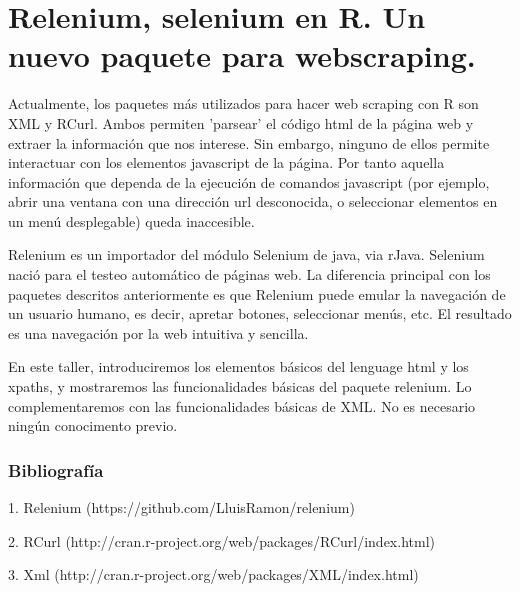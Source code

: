 \chapter{Relenium, selenium en R. Un nuevo paquete para webscraping.}




Actualmente, los paquetes más utilizados para hacer web scraping con R son XML y RCurl. Ambos permiten 'parsear' el código html de la página web y extraer la información que nos interese. Sin embargo, ninguno de ellos permite interactuar con los elementos javascript de la página. Por tanto aquella información que dependa de la ejecución de comandos javascript (por ejemplo, abrir una ventana con una dirección url desconocida, o seleccionar elementos en un menú desplegable) queda inaccesible.

Relenium es un importador del módulo Selenium de java, via rJava. Selenium nació para el testeo automático de páginas web. La diferencia principal con los paquetes descritos anteriormente es que Relenium puede emular la navegación de un usuario humano, es decir, apretar botones, seleccionar menús, etc. El resultado es una navegación por la web intuitiva y sencilla.

En este taller, introduciremos los elementos básicos del lenguage html y los xpaths, y mostraremos las funcionalidades básicas del paquete relenium. Lo complementaremos con las funcionalidades básicas de XML. No es necesario ningún conocimento previo. 

 \bigskip\subsection*{Bibliografía}

 1. Relenium (https://github.com/LluisRamon/relenium)

2. RCurl (http://cran.r-project.org/web/packages/RCurl/index.html)

3. Xml (http://cran.r-project.org/web/packages/XML/index.html)

%

%
